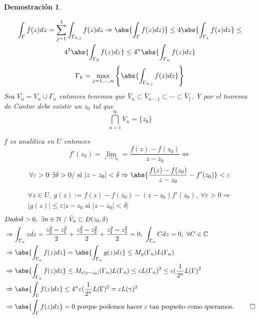 \documentclass[12pt]{book}
\newtheorem*{dem}{Demostración}
\newcommand{\C}{\mathbb{C}}
\newcommand{\N}{\mathbb{N}}
\begin{document}
\begin{dem}
\begin{figure}[H]
\begin{center}
\end{center}
\end{figure}
	
\begin{multline*}
\int_\Gamma f(z)dz = \sum_{j=1}^4\int_{\Gamma_{0,j}} f(z) dz \Rightarrow \abs{\int_\Gamma f(z)dz)}\leq 4\abs{\int_{\Gamma_1}f(z)dz} \leq\\
 4^2\abs{\int_{\Gamma_2}f(z)dz}\leq 4^n \abs{\int_{\Gamma_n} f(z)dz}
\end{multline*}
$$\Gamma_k = \max_{j=1,\ldots, n} \left\{\abs{\int_{\Gamma_{k,j}}f(z)dz}\right\}$$
Sea $\bar{V_n} = V_n \cup \Gamma_n$ entonces tenemos que $\bar{V}_n\subset \bar{V}_{n-1}\subset \cdots \subset \bar{V}_1$. Y por el teorema de Cantor debe existir un $z_0$ tal que 
$$\bigcap_{n=1}^\infty V_n = \{z_0\}$$

$f$ es analítica en $U$ entonces $$f'(z_0) = \lim_{z\to z_0}= \frac{f(z)-f(z_0)}{z-z_0}\Leftrightarrow $$ $$\forall \varepsilon>0\ \exists \delta>0 / \text{ si } |z-z_0|<\delta\Rightarrow \abs{\frac{f(z)-f(z_0)}{z-z_0}-f'(z_0)} <\varepsilon $$

\begin{multline*}\forall z\in U, \ g(z) := f(z) -f(z_0) -(z-z_0)f'(z_0),\ \forall \varepsilon>0 \Rightarrow\\
 |g(z)|\leq \varepsilon|z-z_0 \text{ si } |z-z_0|< \delta|
 \end{multline*}
 \begin{align*}
 &Dado \delta>0,\ \exists n\in\N \ /\ \bar{V}_n \subset D(z_0,\delta)\\
 & \Rightarrow \int_{\Gamma_n}zdz = \frac{z_2^2 -z_1^2}{2}+\frac{z_3^2 -z_2^2}{2}+\frac{z_1^2 -z_3^2}{2} = 0, \ \int_{\Gamma_n} Cdz = 0,\ \forall C \in \C\\
 & \Rightarrow \abs{\int_{\Gamma_n}f(z)dz} = \abs{\int_{\Gamma_n}g(z)dz}  \leq M_g(\Gamma_n)L(\Gamma_n)\\
 & \Rightarrow \abs{\int_{\Gamma_n}f(z)dz} \leq M_{\varepsilon|z-z_0|}(\Gamma_n)L(\Gamma_n) \leq \varepsilon L(\Gamma_n)^2 \leq \varepsilon ( \frac{1}{2^n}L(\Gamma)^2\\
 & \Rightarrow \abs{\int_{\Gamma}f(z)dz} \leq 4^n \varepsilon (\frac{1}{2^n}L(\Gamma)^2 = \varepsilon L(\gamma)^2 \\
 & \Rightarrow \abs{\int_{\Gamma}f(z)dz} = 0\text{ porque podemos hacer }\varepsilon \text{ tan pequeño como queramos. }\qed
 \end{align*}
\end{dem}
\end{document}
